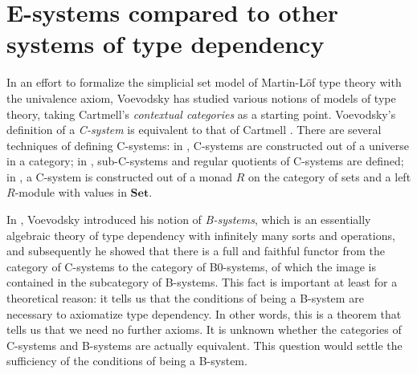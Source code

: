 \begin{comment}
\section{Weak E-systems}

\begin{rmk}
Note that $W$ is a strict $2$-functor frm $\cat{C}$ to $\mathbb{Cat}$ of which
the value at an object $\Gamma$ is specified to be $\cat{C}/\Gamma$, and which
is required to preserve the final object. We could have considered $W$ to be a 
pseudo-functor from $\cat{C}$ to $\mathbb{Cat}$ instead. A coherence theorem
by Power \cite{Power89} then allows for the strictification of this pseudo-functor
into a (strict) weakening structure. (Does this map $\Gamma$ to $\cat{C}/\Gamma$
and final to final?). Thus, we know what a weak pre-weakening system has to be.
The following questions need to be answered:
\begin{itemize}
\item What is a weak weakening/projection/substitution system.
\item What is a weak E-system? I.e.~what are the coherence rules for something
to be a weakening/projection/substitution homomorphism?
\item Can they all be strictified? Are there more examples of weak E-systems?
\end{itemize}
\end{rmk}
\end{comment}

\section{E-systems compared to other systems of type dependency}\label{sec:esys_compared}
In an effort to formalize the simplicial set model of Martin-L\"of type theory
with the univalence axiom, Voevodsky has studied various notions of models of
type theory, taking Cartmell's \emph{contextual categories} as a starting
point. Voevodsky's definition of a \emph{C-system} is equivalent to that of Cartmell
\cite{VV_C-systems_quotients}. There are several techniques of defining 
C-systems: in \cite{VV_Csys_univ}, C-systems are constructed out of a universe
in a category; in \cite{VV_C-systems_quotients}, sub-C-systems and regular
quotients of C-systems are defined; in \cite{VV_C-systems_monad}, a C-system
is constructed out of a monad $R$ on the category of sets and a left $R$-module
with values in $\mathbf{Set}$. 

In \cite{VV_B-systems}, Voevodsky introduced his notion of \emph{B-systems}, which is
an essentially algebraic theory of type dependency with infinitely many sorts 
and operations, and subsequently he showed that there is a full and faithful
functor from the category of C-systems to the category of B0-systems, of which
the image is contained in the subcategory of B-systems. This fact is important at least
for a theoretical reason: it tells us that the conditions of being a B-system
are necessary to axiomatize type dependency. In other words,
this is a theorem that tells us that we need no further axioms. It is
unknown whether the categories of C-systems and B-systems are actually equivalent.
This question would settle the sufficiency of the conditions of being a B-system.


